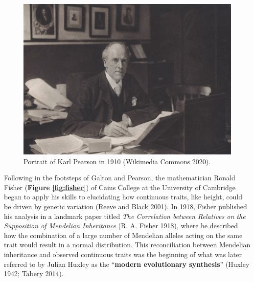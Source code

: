 \documentclass[
]{book}
\begin{document}
\begin{figure}

{\centering \includegraphics[width=0.7\linewidth]{figs/introduction/Karl_Pearson_1910} 

}

\caption{Portrait of Karl Pearson in 1910 (Wikimedia Commons 2020).}\label{fig:pearson}
\end{figure}

Following in the footsteps of Galton and Pearson, the mathematician Ronald Fisher (\textbf{Figure \ref{fig:fisher}}) of Caius College at the University of Cambridge began to apply his skills to elucidating how continuous traits, like height, could be driven by genetic variation (Reeve and Black 2001). In 1918, Fisher published his analysis in a landmark paper titled \emph{The Correlation between Relatives on the Supposition of Mendelian Inheritance} (R. A. Fisher 1918), where he described how the combination of a large number of Mendelian alleles acting on the same trait would result in a normal distribution. This reconciliation between Mendelian inheritance and observed continuous traits was the beginning of what was later referred to by Julian Huxley as the ``\textbf{modern evolutionary synthesis}'' (Huxley 1942; Tabery 2014).
\end{document}

